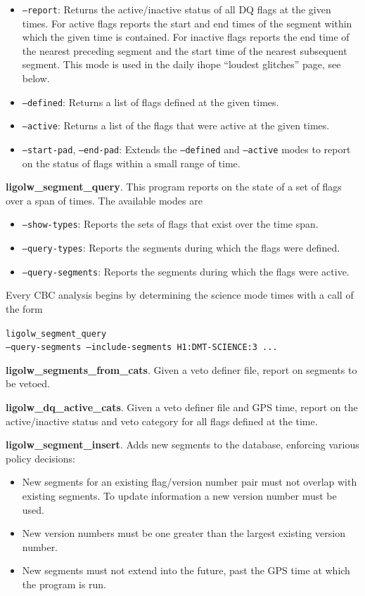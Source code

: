 \begin{itemize}
\item \texttt{--report}:  Returns the active/inactive status of all DQ flags at the
given times.  For active flags reports the start and end times of the
segment within which the given time is contained.  For inactive flags
reports the end time of the nearest preceding segment and the start
time of the nearest subsequent segment.  This mode is used in the
daily ihope ``loudest glitches'' page, see below.
\item \texttt{--defined}: Returns a list of flags defined at the
given times.
\item \texttt{--active}: Returns a list of the flags that were active
at the given times.
\item \texttt{--start-pad}, \texttt{--end-pad}: Extends the
\texttt{--defined} and \texttt{--active} modes to report on the status
of flags within a small range of time.
\end{itemize}


\textbf{ligolw\_segment\_query}.  This program reports on the state of a
set of flags over a span of times.  The available modes are

\begin{itemize}
\item \texttt{--show-types}: Reports the sets of flags that exist over
the time span.
\item \texttt{--query-types}: Reports the segments during which the
flags were defined.
\item \texttt{--query-segments}: Reports the segments during which the
flags were active.
\end{itemize}

Every CBC analysis begins by determining the science mode times with a
call of the form

\vspace*{5mm}
\texttt{ligolw\_segment\_query} \\
\hspace*{0.5in}\texttt{--query-segments --include-segments H1:DMT-SCIENCE:3 ...}
\vspace*{5mm}

\textbf{ligolw\_segments\_from\_cats}.  Given a veto definer file,
report on segments to be vetoed. 

\textbf{ligolw\_dq\_active\_cats}.  Given a veto definer file and GPS
time, report on the active/inactive status and veto category for all
flags defined at the time.

\textbf{ligolw\_segment\_insert}.  Adds new segments to the database,
enforcing various policy decisions:
\begin{itemize}
\item New segments for an existing flag/version number pair must not overlap 
with existing segments.  To update information a new version number must be used.
\item New version numbers must be one greater than the largest
existing version number.
\item New segments must not extend into the future, past the GPS time
at which the program is run.
\end{itemize}
\fi

